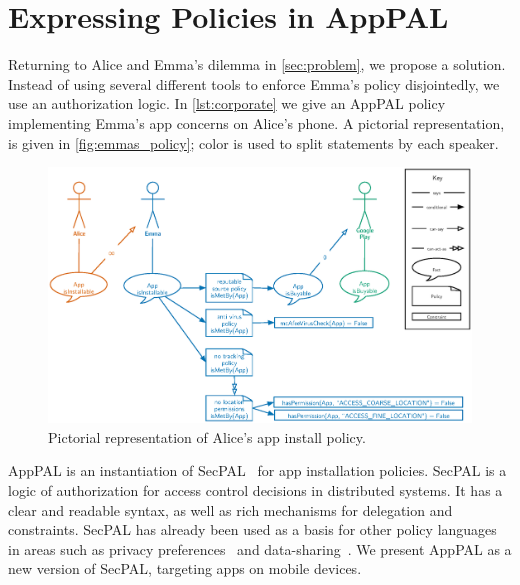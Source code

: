 \documentclass[twoside,letterpaper]{soups}
\begin{document}
\section{Expressing Policies in AppPAL}
\label{sec:idea}

Returning to Alice and Emma's dilemma in \autoref{sec:problem}, we propose a solution.
Instead of using several different tools to enforce Emma's policy disjointedly, we use an authorization logic.
In \autoref{lst:corporate} we give an AppPAL policy implementing Emma's app concerns on Alice's phone.
A pictorial representation, is given in \autoref{fig:emmas_policy}; color is used to split statements by each speaker.

\begin{figure}
  \includegraphics{figures/bob-policy.eps}
  \caption{Pictorial representation of Alice's app install policy.}
\label{fig:emmas_policy}
\end{figure}

AppPAL is an instantiation of SecPAL~\citep{Becker:2006vh} for app installation policies.
SecPAL is a logic of authorization for access control decisions in distributed systems.
It has a clear and readable syntax, as well as rich mechanisms for delegation and constraints.
SecPAL has already been used as a basis for other policy languages in areas such as privacy preferences~\citep{Becker:2009ula} and data-sharing~\citep{Aziz:2011vt}.
We present AppPAL as a new version of SecPAL, targeting apps on mobile devices.
\end{document}
